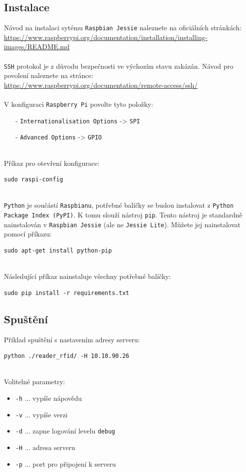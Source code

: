 \documentclass[czech,BP]{thesiskiv}
\begin{document}
\subsection{Instalace}
Návod na instalaci sytému \texttt{Raspbian Jessie} naleznete na oficiálních stránkách: 
\\ 
\url{https://www.raspberrypi.org/documentation/installation/installing-images/README.md}
\\\\
\texttt{SSH} protokol je z důvodu bezpečnosti ve výchozím stavu zakázán. Návod pro povolení naleznete na stránce: 
\\
\url{https://www.raspberrypi.org/documentation/remote-access/ssh/}
\\\\
V konfiguraci \texttt{Raspberry Pi} povolte tyto položky:
\begin{itemize}[noitemsep]
\item [-] \texttt{Internationalisation Options} -> \texttt{SPI}
\item [-] \texttt{Advanced Options} -> \texttt{GPIO}
\end{itemize}
\ \\
Příkaz pro otevření konfigurace:
\begin{verbatim}
sudo raspi-config
\end{verbatim}
\ \\
\texttt{Python} je součástí \texttt{Raspbianu}, potřebné balíčky se budou instalovat z \texttt{Python Package Index (PyPI)}. K tomu slouží nástroj \texttt{pip}. Tento nástroj je standardně nainstalován v \texttt{Raspbian Jessie} (ale ne \texttt{Jessie Lite}). Můžete jej nainstalovat pomocí příkazu: 
\begin{verbatim}
sudo apt-get install python-pip
\end{verbatim}
\ \\
Následující příkaz nainstaluje všechny potřebné balíčky: 
\begin{verbatim}
sudo pip install -r requirements.txt
\end{verbatim}

\subsection{Spuštění}
Příklad spuštění s nastavením adresy serveru:
\begin{verbatim}
python ./reader_rfid/ -H 10.10.90.26
\end{verbatim}
\ \\
Volitelné parametry:
\begin{itemize}[noitemsep]
	\item \texttt{-h} ... vypíše nápovědu
	\item \texttt{-v} ... vypíše verzi
	\item \texttt{-d} ... zapne logování levelu \texttt{debug}
	\item \texttt{-H} ... adresa serveru
	\item \texttt{-p} ... port pro připojení k serveru
\end{itemize}
\end{document}
